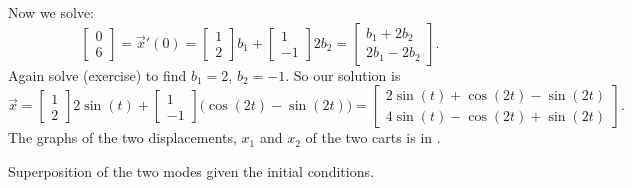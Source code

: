 \documentclass{ximera}
\begin{document}
\begin{exampleSol}
    Now we solve:
    \begin{equation*}
        \begin{bmatrix} 
            0 \\ 
            6 
        \end{bmatrix}
        = {\vec{x}}'(0) = 
        \begin{bmatrix} 
            1 \\ 
            2 
        \end{bmatrix}
        b_1 +
        \begin{bmatrix} 
            1 \\ 
            -1 
        \end{bmatrix}
        2 b_2 =
        \begin{bmatrix} 
            b_1+2b_2 \\ 
            2b_1-2b_2 
        \end{bmatrix} .
    \end{equation*}
    Again solve (exercise) to find  $b_1 = 2$, $b_2 = -1$.  So our solution is
    \begin{equation*}
        \vec{x} = 
        \begin{bmatrix} 
            1 \\ 
            2 
        \end{bmatrix}
        2 \sin (t) +
        \begin{bmatrix} 
            1 \\ 
            -1 
        \end{bmatrix}
        \bigl( \cos (2t) - \sin (2t) \bigr) =
        \begin{bmatrix}
            2 \sin (t) + \cos(2t)- \sin(2t) \\
            4 \sin (t) - \cos(2t) + \sin(2t)
        \end{bmatrix} .
    \end{equation*}
    The graphs of the two displacements, $x_1$ and $x_2$ of the two carts is in
    .
    \begin{myfig}
        \capstart
        \caption{Superposition of the two modes given the initial conditions.\label{sosa:superposfig}}
    \end{myfig}
\end{exampleSol}
\end{document}

